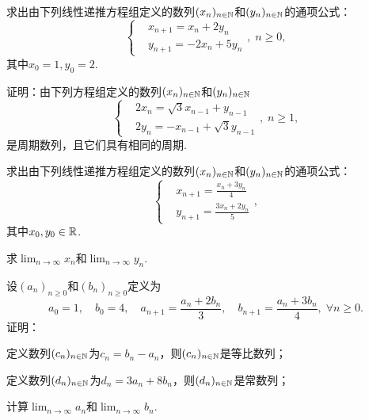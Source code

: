 \begin{problem}
  求出由下列线性递推方程组定义的数列$(x_n)_{n\in\mathbb N}$和$(y_n)_{n\in\mathbb N}$的通项公式：
  \[
    \left\{
      \begin{aligned}
        & x_{n+1} = x_n + 2y_n \\
        & y_{n+1} = -2x_n + 5y_n
      \end{aligned}
    \right.,\; n\ge0,
  \]
  其中$x_0=1,y_0=2$.
\end{problem}

\begin{problem}
  证明：由下列方程组定义的数列$(x_n)_{n\in\mathbb N}$和$(y_n)_{n\in\mathbb N}$
  \[
    \left\{
      \begin{aligned}
        & 2x_n = \sqrt3x_{n-1} + y_{n-1} \\
        & 2y_n = -x_{n-1} + \sqrt3y_{n-1}
      \end{aligned}
    \right.,\; n\ge1,
  \]
  是周期数列，且它们具有相同的周期.
\end{problem}

\begin{problem}
  \begin{inparaenum}[(a)]
    \item 求出由下列线性递推方程组定义的数列$(x_n)_{n\in\mathbb N}$和$(y_n)_{n\in\mathbb N}$的通项公式：
    \[
      \left\{
        \begin{aligned}
          & x_{n+1} = \frac{x_n+3y_n}4 \\
          & y_{n+1} = \frac{3x_n+2y_n}5
        \end{aligned}
      \right.,
    \]
    其中$x_0,y_0\in\mathbb R$.

  \item 求$\lim_{n\to\infty}x_n$和$\lim_{n\to\infty}y_n$.
  \end{inparaenum}
\end{problem}

\begin{problem}
  设$(a_n)_{n\ge0}$和$(b_n)_{n\ge0}$定义为
  \[
    a_0 = 1,\quad  b_0=4,\quad  a_{n+1} = \frac{a_n+2b_n}3,\quad  b_{n+1} = \frac{a_n+3b_n}4,\; \forall n\ge0.
  \]
  证明：
  \begin{enum}
    \item\label{prob3.32a} 定义数列$(c_n)_{n\in\mathbb N}$为$c_n=b_n-a_n$，则$(c_n)_{n\in\mathbb N}$是等比数列；
    \item\label{prob3.32b} 定义数列$(d_n)_{n\in\mathbb N}$为$d_n=3a_n+8b_n$，则$(d_n)_{n\in\mathbb N}$是常数列；
    \item 计算$\lim_{n\to\infty}a_n$和$\lim_{n\to\infty}b_n$.
  \end{enum}
\end{problem}

